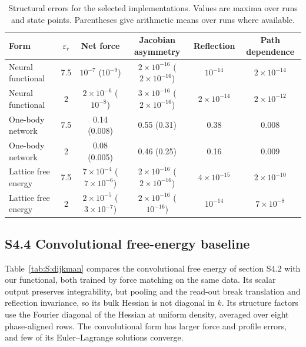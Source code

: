 \begin{table}[H]
\centering
\caption{Structural errors for the selected implementations. Values are maxima over runs and state points. Parentheses give arithmetic means over runs where available.}
\label{tab:S:archstruct}
\begin{tabular}{l c c c c c}
Form & $\varepsilon_r$ & Net force & Jacobian asymmetry & Reflection & Path dependence\\
\midrule
Neural functional & 7.5 & $10^{-7}$ ($10^{-9}$) & $2\times10^{-16}$ ($2\times10^{-16}$) & $10^{-14}$ & $2\times10^{-14}$\\
Neural functional & 2 & $2\times10^{-6}$ ($10^{-8}$) & $3\times10^{-16}$ ($2\times10^{-16}$) & $2\times10^{-14}$ & $2\times10^{-12}$\\
One-body network & 7.5 & 0.14 (0.008) & 0.55 (0.31) & 0.38 & 0.008\\
One-body network & 2 & 0.08 (0.005) & 0.46 (0.25) & 0.16 & 0.009\\
Lattice free energy & 7.5 & $7\times10^{-4}$ ($7\times10^{-6}$) & $2\times10^{-16}$ ($2\times10^{-16}$) & $4\times10^{-15}$ & $2\times10^{-10}$\\
Lattice free energy & 2 & $2\times10^{-5}$ ($3\times10^{-7}$) & $2\times10^{-16}$ ($10^{-16}$) & $10^{-14}$ & $7\times10^{-8}$\\
\bottomrule
\end{tabular}
\end{table}


\subsection*{S4.4 Convolutional free-energy baseline}
Table~\ref{tab:S:dijkman} compares the convolutional free energy of section S4.2 with our functional, both trained by force matching on the same data. Its scalar output preserves integrability, but pooling and the read-out break translation and reflection invariance, so its bulk Hessian is not diagonal in $k$. Its structure factors use the Fourier diagonal of the Hessian at uniform density, averaged over eight phase-aligned rows. The convolutional form has larger force and profile errors, and few of its Euler--Lagrange solutions converge.

